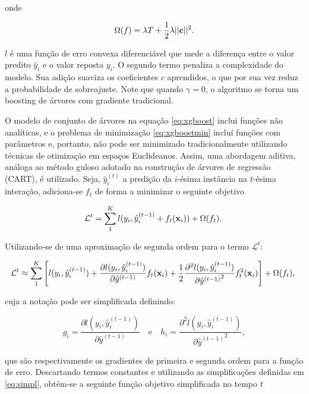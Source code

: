 \noindent
onde

\begin{equation}
\Omega(f)=\lambda{T}+\frac{1}{2}\lambda||{\bf c}||^2\mbox{.}
\end{equation}

$l$ é uma função de erro convexa diferenciável que mede a diferença entre o valor predito $\hat{y}_i$ e o valor reposta $y_i$. O segundo termo penaliza a complexidade do modelo. Sua adição suaviza os coeficientes $c$ aprendidos, o que por sua vez reduz a probabilidade de sobreajuste. Note que quando $\gamma=0$, o algoritmo se torna um boosting de árvores com gradiente tradicional.

O modelo de conjunto de árvores na equação \eqref{eq:xgboost} inclui funções não analíticas, e o problema de minimização \eqref{eq:xgboostmin} incluí funções com parâmetros e, portanto, não pode ser minimizado tradicionalmente utilizando técnicas de otimização em espaços Euclideanos. Assim, uma abordagem aditiva, análoga ao método guloso adotado na construção de árvores de regressão (CART), é utilizado. Seja, $\hat{y}_{i}^{(t)}$ a predição da $i$-ésima instância na $t$-ésima interação, adiciona-se $f_t$ de forma a minimizar o seguinte objetivo

\begin{equation}
\mathcal{L}^{t}=\sum_{1}^{K}l(y_i, \hat{y}_i^{(t-1)}+f_t({\bf x}_i))+\Omega(f_t)\mbox{.}~
\end{equation}

Utilizando-se de uma aproximação de segunda ordem para o termo $\mathcal{L}^{t}$:

\begin{equation}
\mathcal{L}^{t}\approx\sum_{1}^{K}\left[l(y_i, \hat{y}_i^{(t-1)})+\frac{\partial l(y_i, \hat{y}_i^{(t-1)})}{\partial\hat{y }^{(t-1)}}f_t({\bf x}_i)+\frac{1}{2}\frac{\partial^2 l(y_i, \hat{y}_i^{(t-1)})}{{\partial\hat{y }^{(t-1)}}^2}f_t^2({\bf x}_i)\right]+\Omega(f_t)\mbox{,}~
\end{equation}

cuja a notação pode ser simplificada definindo:

\begin{equation}\label{eq:simpl}
g_i=\frac{\partial l(y_i, \hat{y}_i^{(t-1)})}{\partial\hat{y }^{(t-1)}} \quad \mbox{e} \quad h_i=\frac{\partial^2 l(y_i, \hat{y}_i^{(t-1)})}{{\partial\hat{y }^{(t-1)}}^2}\mbox{,}~
\end{equation}

que são respectivamente os gradientes de primeira e segunda ordem para a função de erro. Descartando termos constantes e utilizando as simplificações definidas em \eqref{eq:simpl}, obtém-se a seguinte função objetivo simplificada no tempo $t$

